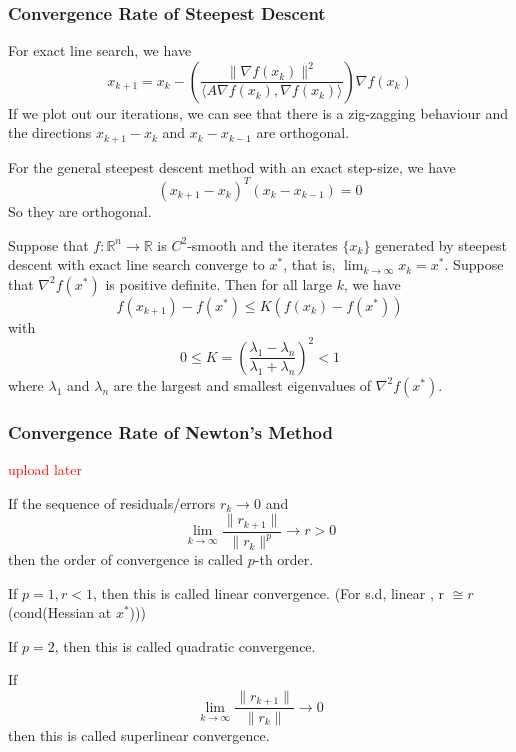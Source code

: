 \subsubsection{Convergence Rate of Steepest Descent}
For exact line search, we have
$$x_{k+1} = x_k - \left(\frac{\| \nabla f(x_k)\|^2}{\langle A \nabla f(x_k), \nabla f(x_k) \rangle}\right) \nabla f(x_k)$$
If we plot out our iterations, we can see that there is a zig-zagging behaviour and the directions $x_{k+1} - x_k$ and $x_k - x_{k-1}$ are orthogonal.
\begin{theorem}
    For the general steepest descent method with an exact step-size, we have
    $$(x_{k+1} - x_k)^T (x_k - x_{k-1}) = 0$$
    So they are orthogonal.
\end{theorem}
\begin{theorem}
    Suppose that $f: \mathbb R^n \to \mathbb R$ is $C^2$-smooth and the iterates $\{x_k\}$ generated by steepest descent with exact line search converge to $x^*$, that is, $\lim_{k \to \infty} x_k = x^*$. Suppose that $\nabla^2 f(x^*)$ is positive definite. Then for all large $k$, we have
    $$f(x_{k+1}) - f(x^*) \leq K (f(x_k) - f(x^*))$$ with 
    $$0 \leq K = \left(\frac{\lambda_1 - \lambda_n}{\lambda_1 + \lambda_n}\right)^2 < 1$$
    where $\lambda_1$ and $\lambda_n$ are the largest and smallest eigenvalues of $\nabla^2 f(x^*)$. 
\end{theorem}

\subsubsection{Convergence Rate of Newton's Method}

\begin{definition}
    \textcolor{red}{upload later}
  \end{definition}
  \begin{definition}
    If the sequence of residuals/errors $r_k \to 0$ and
    $$\lim_{k \to \infty} \frac{\|r_{k+1}\|}{\|r_k\|^p} \to r > 0$$
    then the order of convergence is called $p$-th order.

    If $p = 1, r < 1$, then this is called linear convergence. (For s.d, linear , r $\cong r$ (cond(Hessian at $x^*$)))
    
    If $p = 2$, then this is called quadratic convergence.

    If $$\lim_{k \to \infty} \frac{\|r_{k+1} \|}{\|r_k \|} \to 0$$ then this is called superlinear convergence.
  \end{definition}
  
